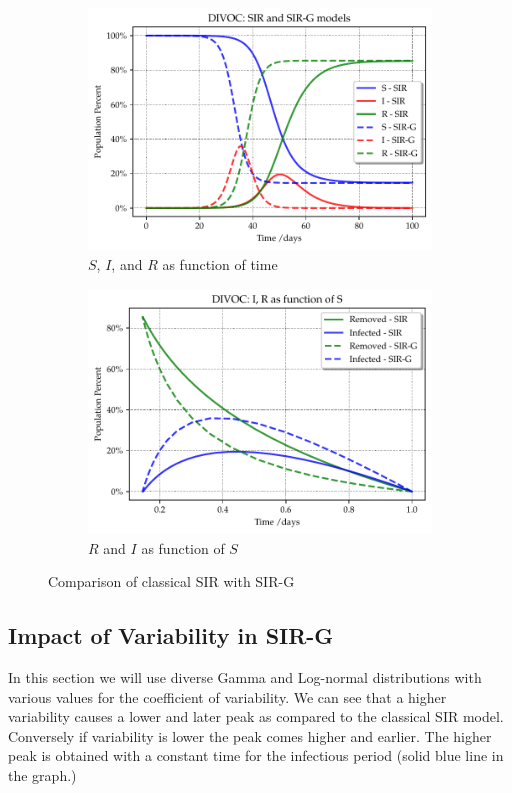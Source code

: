 \documentclass[twoside,USenglish,10pt]{article}
\begin{document}
\begin{figure}
	\centering
	\begin{subfigure}{.45\textwidth}
		\includegraphics[width=.8\linewidth]{DIVOC-SIR-comp.pdf}
		\caption{$S$, $I$, and $R$ as function of time}
	\end{subfigure}	
	\begin{subfigure}{.45\textwidth}
		\includegraphics[width=.8\linewidth]{DIVOC-IR-comp.pdf}
		\caption{$R$ and $I$ as function of $S$}
	\end{subfigure}	
	\caption{Comparison of classical SIR with SIR-G}
	\label{fig:comp}
\end{figure}


\subsection{Impact of Variability in SIR-G}

In this section we will use diverse Gamma and Log-normal distributions with various values for the coefficient of variability. We can see that a higher variability causes a lower and later peak as compared to the classical SIR model. Conversely if variability is lower the peak comes higher and earlier. The higher peak is obtained with a constant time for the infectious period (solid blue line in the graph.)
\end{document}
